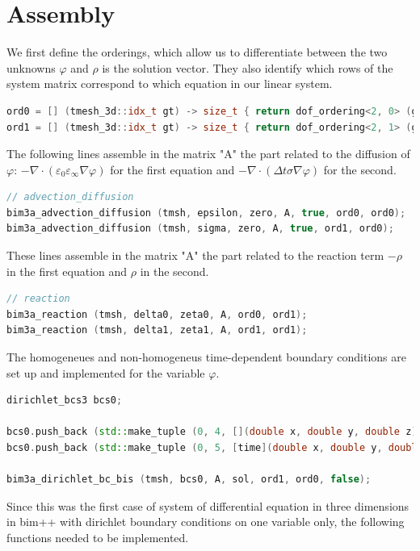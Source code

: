 \documentclass{Configuration_Files/PoliMi3i_thesis}
\let\phi\varphi
\let\epsilon\varepsilon
\begin{document}
\section{Assembly}
We first define the orderings, which allow us to differentiate between the two unknowns $\phi$ and $\rho$ is the solution vector. They also identify which rows of the system matrix correspond to which equation in our linear system.
\begin{lstlisting}[language=C++]
ord0 = [] (tmesh_3d::idx_t gt) -> size_t { return dof_ordering<2, 0> (gt); },
ord1 = [] (tmesh_3d::idx_t gt) -> size_t { return dof_ordering<2, 1> (gt); };
\end{lstlisting}
The following lines assemble in the matrix "A" the part related to the diffusion of $\phi$: $-\nabla\cdot(\epsilon_0\epsilon_\infty\nabla\phi)$ for the first equation and $-\nabla\cdot(\Delta t\sigma\nabla\phi)$ for the second.
\begin{lstlisting}[language=C++]
// advection_diffusion
bim3a_advection_diffusion (tmsh, epsilon, zero, A, true, ord0, ord0);
bim3a_advection_diffusion (tmsh, sigma, zero, A, true, ord1, ord0);
\end{lstlisting}
These lines assemble in the matrix "A" the part related to the reaction term $-\rho$ in the first equation and $\rho$ in the second.
\begin{lstlisting}[language=C++]
// reaction
bim3a_reaction (tmsh, delta0, zeta0, A, ord0, ord1);
bim3a_reaction (tmsh, delta1, zeta1, A, ord1, ord1);
\end{lstlisting}
The homogeneues and non-homogeneus time-dependent boundary conditions are set up and implemented for the variable $\phi$.
\begin{lstlisting}[language=C++]
dirichlet_bcs3 bcs0;
    
bcs0.push_back (std::make_tuple (0, 4, [](double x, double y, double z){return 0.0;})); //bottom
bcs0.push_back (std::make_tuple (0, 5, [time](double x, double y, double z){return 1.5e4 * (1 - exp(-tau/10.0));})); //top
    
bim3a_dirichlet_bc_bis (tmsh, bcs0, A, sol, ord1, ord0, false);
\end{lstlisting}
Since this was the first case of system of differential equation in three dimensions in bim++ with dirichlet boundary conditions on one variable only, the following functions needed to be implemented. 
\end{document}
